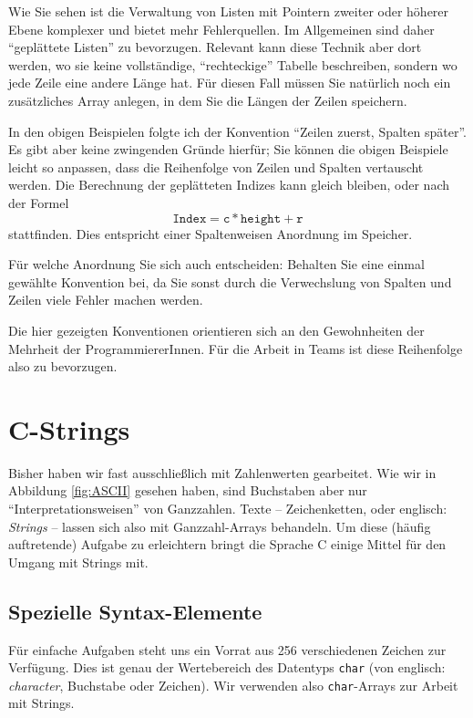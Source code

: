 \begin{hintbox}
Wie Sie sehen ist die Verwaltung von Listen mit Pointern zweiter oder höherer Ebene komplexer und bietet mehr Fehlerquellen. Im Allgemeinen sind daher \enquote{geplättete Listen} zu bevorzugen. Relevant kann diese Technik aber dort werden, wo sie keine vollständige, \enquote{rechteckige} Tabelle beschreiben, sondern wo jede Zeile eine andere Länge hat. Für diesen Fall müssen Sie natürlich noch ein zusätzliches Array anlegen, in dem Sie die Längen der Zeilen speichern.
\end{hintbox}

\begin{hintbox}
In den obigen Beispielen folgte ich der Konvention \enquote{Zeilen zuerst, Spalten später}. Es gibt aber keine zwingenden Gründe hierfür; Sie können die obigen Beispiele leicht so anpassen, dass die Reihenfolge von Zeilen und Spalten vertauscht werden. Die Berechnung der geplätteten Indizes kann gleich bleiben, oder nach der Formel
\[ \mathtt{Index = c * height + r} \]
stattfinden. Dies entspricht einer Spaltenweisen Anordnung im Speicher.

Für welche Anordnung Sie sich auch entscheiden: Behalten Sie eine einmal gewählte Konvention bei, da Sie sonst durch die Verwechslung von Spalten und Zeilen viele Fehler machen werden.

Die hier gezeigten Konventionen orientieren sich an den Gewohnheiten der Mehrheit der ProgrammiererInnen. Für die Arbeit in Teams ist diese Reihenfolge also zu bevorzugen.
\end{hintbox}

\section{C-Strings} \label{sec:string}
Bisher haben wir fast ausschließlich mit Zahlenwerten gearbeitet. Wie wir in Abbildung \ref{fig:ASCII} gesehen haben, sind Buchstaben aber nur \enquote{Interpretationsweisen} von Ganzzahlen. Texte -- Zeichenketten, oder englisch: \emph{Strings} -- lassen sich also mit Ganzzahl-Arrays behandeln. Um diese (häufig auftretende) Aufgabe zu erleichtern bringt die Sprache C einige Mittel für den Umgang mit Strings mit.

\subsection{Spezielle Syntax-Elemente}
Für einfache Aufgaben steht uns ein Vorrat aus 256 verschiedenen Zeichen zur Verfügung. Dies ist genau der Wertebereich des Datentyps \texttt{char} (von englisch: \emph{character}, Buchstabe oder Zeichen). Wir verwenden also \texttt{char}-Arrays zur Arbeit mit Strings.

